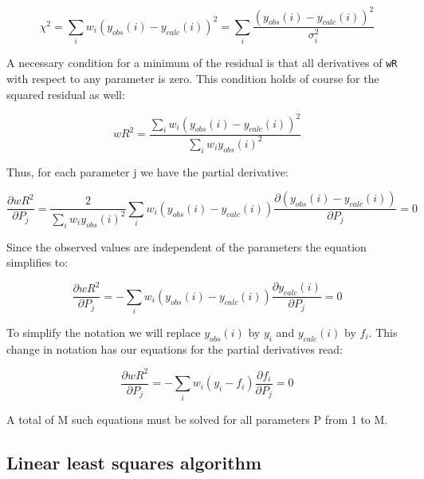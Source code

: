 \begin{equation}
  \chi^2 =  \sum_{i} w_{i} (y_{obs}(i) - y_{calc}(i))^2
  = \sum_{i} \frac{(y_{obs}(i) - y_{calc}(i))^2}{\sigma_{i}^{2}}
  \label{math-eq-chi2}
\end{equation}

A necessary condition for a minimum of the residual is that all
derivatives of {\tt wR} with respect to any parameter is zero.
This condition holds of course for the squared residual as well:

\begin{equation}
   wR^2 = {\frac{\sum_{i} w_{i} (y_{obs}(i) - y_{calc}(i))^2}
                   {\sum_{i} w_{i} y_{obs}(i)^2}}
  \label{math-eq-rsqu}
\end{equation}

Thus, for each parameter j we have the partial derivative:

\begin{equation}
  \frac{\partial wR^2}{\partial P_{j}} = 
  \frac{2}{\sum_{i} w_{i} y_{obs}(i)^2}
  \sum_{i} w_{i} 
  \left ( 
  y_{obs}(i) - y_{calc}(i)
  \right )
  \frac{\partial (y_{obs}(i) - y_{calc}(i))}
                      {\partial P_{j}}
  = 0
  \label{math-eq-der}
\end{equation}

Since the observed values are independent of the parameters the equation 
simplifies to:

\begin{equation}
  \frac{\partial wR^2}{\partial P_{j}} = 
  - \sum_{i} w_{i} 
  \left ( 
  y_{obs}(i) - y_{calc}(i)
  \right )
  \frac{\partial y_{calc}(i)}
        {\partial P_{j}}
  = 0
  \label{math-eq-der2}
\end{equation}

To simplify the notation we will replace $y_{obs}(i)$ by $y_{i}$ 
and $y_{calc}(i)$ by $f_{i}$. This change in notation has our 
equations for the partial derivatives read:

\begin{equation}
  \frac{\partial wR^2}{\partial P_{j}} = 
  - \sum_{i} w_{i} 
  \left ( 
  y_{i} - f_{i}
  \right )
  \frac{\partial f_{i}}
        {\partial P_{j}}
  = 0
  \label{math-eq-der3}
\end{equation}

A total of M such equations must be  solved for all parameters P
from 1 to M.

\subsection{Linear least squares algorithm \label{math-lin}} 
 
